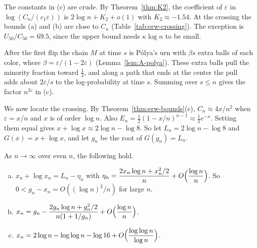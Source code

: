 The constants in (c) are crude. By Theorem~\ref{thm:K2}, the coefficient of
$\varepsilon$ in $\log(C_n/(c_1\varepsilon))$ is $2\log n+K_2+o(1)$ with
$K_2\approx-1.54$. At the crossing the bounds (a) and (b) are close to
$C_n$ (Table~\ref{tab:erw-crossing}). The exception is
$U_{50}/C_{50}=69.5$, since the upper bound needs $\kappa\log n$ to be
small.

After the first flip the chain $M$ at time $s$ is P\'olya's urn with
$\beta s$ extra balls of each color, where $\beta=\varepsilon/(1-2\varepsilon)$
(Lemma~\ref{lem:A-polya}). These extra balls pull the minority fraction
toward $\frac12$, and along a path that ends at the center the pull adds
about $2\varepsilon/s$ to the log-probability at time $s$. Summing over
$s\le n$ gives the factor $n^{2\varepsilon}$ in (c).

We now locate the crossing. By Theorem~\ref{thm:erw-bounds}(c),
$C_n\approx4x/n^2$ when $\varepsilon=x/n$ and $x$ is of order $\log n$.
Also $E_n=\frac12(1-x/n)^{n-1}\approx\frac12e^{-x}$. Setting them equal
gives $x+\log x\approx2\log n-\log8$. So let $L_n=2\log n-\log8$ and
$G(x)=x+\log x$, and let $g_n$ be the root of $G(g_n)=L_n$.

\begin{theorem}\label{thm:erw-crossing}
As $n\to\infty$ over even $n$, the following hold.
\begin{enumerate}[(a)]
\item $x_n+\log x_n=L_n-\eta_n$ with
$\eta_n=\dfrac{2x_n\log n+x_n^2/2}{n}+O\Bigl(\dfrac{\log n}n\Bigr)$. So
$0<g_n-x_n=O((\log n)^2/n)$ for large $n$.
\item $x_n=g_n-\dfrac{2g_n\log n+g_n^2/2}{n(1+1/g_n)}+O\Bigl(\dfrac{\log n}{n}\Bigr)$.
\item $x_n=2\log n-\log\log n-\log16+O\Bigl(\dfrac{\log\log n}{\log n}\Bigr)$.
\end{enumerate}
\end{theorem}

